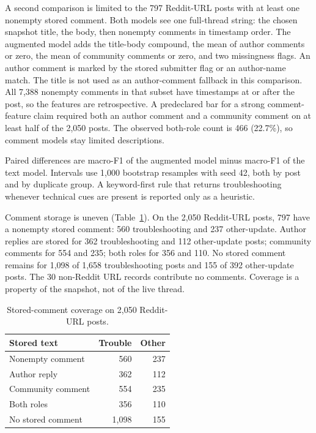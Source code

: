 \documentclass[conference,letterpaper]{IEEEtran}
\begin{document}
A second comparison is limited to the 797 Reddit-URL posts with at least one nonempty stored comment. Both models see one full-thread string: the chosen snapshot title, the body, then nonempty comments in timestamp order. The augmented model adds the title-body compound, the mean of author comments or zero, the mean of community comments or zero, and two missingness flags. An author comment is marked by the stored submitter flag or an author-name match. The title is not used as an author-comment fallback in this comparison. All 7,388 nonempty comments in that subset have timestamps at or after the post, so the features are retrospective. A predeclared bar for a strong comment-feature claim required both an author comment and a community comment on at least half of the 2,050 posts. The observed both-role count is 466 (22.7\%), so comment models stay limited descriptions.

Paired differences are macro-F1 of the augmented model minus macro-F1 of the text model. Intervals use 1,000 bootstrap resamples with seed 42, both by post and by duplicate group. A keyword-first rule that returns troubleshooting whenever technical cues are present is reported only as a heuristic.

Comment storage is uneven (Table~\ref{tab:cov}). On the 2,050 Reddit-URL posts, 797 have a nonempty stored comment: 560 troubleshooting and 237 other-update. Author replies are stored for 362 troubleshooting and 112 other-update posts; community comments for 554 and 235; both roles for 356 and 110. No stored comment remains for 1,098 of 1,658 troubleshooting posts and 155 of 392 other-update posts. The 30 non-Reddit URL records contribute no comments. Coverage is a property of the snapshot, not of the live thread.

\begin{table}[t]
\caption{Stored-comment coverage on 2,050 Reddit-URL posts.}
\label{tab:cov}
\centering
\footnotesize
\setlength{\tabcolsep}{4pt}
\begin{tabular}{lrr}
\toprule
Stored text & Trouble & Other \\
\midrule
Nonempty comment & 560 & 237 \\
Author reply & 362 & 112 \\
Community comment & 554 & 235 \\
Both roles & 356 & 110 \\
No stored comment & 1,098 & 155 \\
\bottomrule
\end{tabular}
\end{table}
\end{document}
